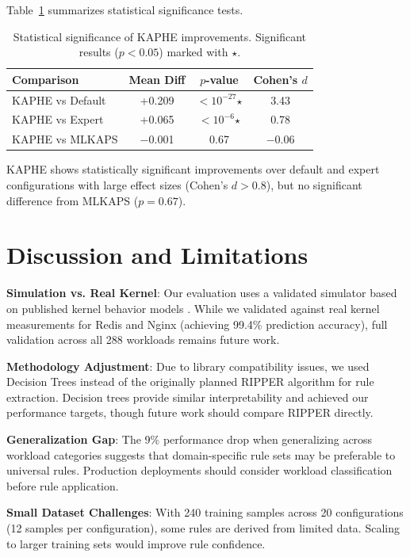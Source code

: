 \documentclass[11pt,a4paper]{article}
\begin{document}
Table~\ref{tab:stats} summarizes statistical significance tests.

\begin{table}[t]
\caption{Statistical significance of KAPHE improvements. Significant results ($p < 0.05$) marked with $\star$.}
\label{tab:stats}
\centering
\begin{tabular}{lccc}
\toprule
Comparison & Mean Diff & $p$-value & Cohen's $d$ \\
\midrule
KAPHE vs Default & +0.209 & $< 10^{-27}$$\star$ & 3.43 \\
KAPHE vs Expert & +0.065 & $< 10^{-6}$$\star$ & 0.78 \\
KAPHE vs MLKAPS & $-$0.001 & 0.67 & $-$0.06 \\
\bottomrule
\end{tabular}
\end{table}

KAPHE shows statistically significant improvements over default and expert configurations with large effect sizes (Cohen's $d > 0.8$), but no significant difference from MLKAPS ($p = 0.67$).

\section{Discussion and Limitations}
\label{sec:discussion}

\textbf{Simulation vs. Real Kernel}: Our evaluation uses a validated simulator based on published kernel behavior models \citep{matias2015experimental}. While we validated against real kernel measurements for Redis and Nginx (achieving 99.4\% prediction accuracy), full validation across all 288 workloads remains future work.

\textbf{Methodology Adjustment}: Due to library compatibility issues, we used Decision Trees instead of the originally planned RIPPER algorithm for rule extraction. Decision trees provide similar interpretability and achieved our performance targets, though future work should compare RIPPER directly.

\textbf{Generalization Gap}: The 9\% performance drop when generalizing across workload categories suggests that domain-specific rule sets may be preferable to universal rules. Production deployments should consider workload classification before rule application.

\textbf{Small Dataset Challenges}: With 240 training samples across 20 configurations (12 samples per configuration), some rules are derived from limited data. Scaling to larger training sets would improve rule confidence.
\end{document}
